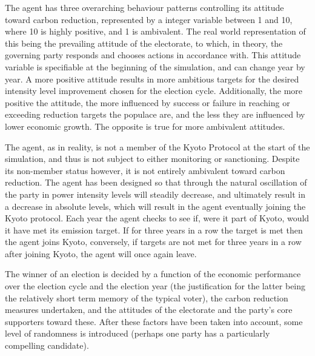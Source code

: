 The agent has three overarching behaviour patterns controlling its attitude toward carbon reduction, represented by a integer variable between 1 and 10, where 10 is highly positive, and 1 is ambivalent. The real world representation of this being the prevailing attitude of the electorate, to which, in theory, the governing party responds and chooses actions in accordance with. This attitude variable is specifiable at the beginning of the simulation, and can change year by year. A more positive attitude results in more ambitious targets for the desired intensity level improvement chosen for the election cycle. Additionally, the more positive the attitude, the more influenced by success or failure in reaching or exceeding reduction targets the populace are, and the less they are influenced by lower economic growth. The opposite is true for more ambivalent attitudes.

The agent, as in reality, is not a member of the Kyoto Protocol at the start of the simulation, and thus is not subject to either monitoring or sanctioning. Despite its non-member status however, it is not entirely ambivalent toward carbon reduction. The agent has been designed so that through the natural oscillation of the party in power intensity levels will steadily decrease, and ultimately result in a decrease in absolute levels, which will result in the agent eventually joining the Kyoto protocol. Each year the agent checks to see if, were it part of Kyoto, would it have met its emission target. If for three years in a row the target is met then the agent joins Kyoto, conversely, if targets are not met for three years in a row after joining Kyoto, the agent will once again leave.

The winner of an election is decided by a function of the economic performance over the election cycle and the election year (the justification for the latter being the relatively short term memory of the typical voter), the carbon reduction measures undertaken, and the attitudes of the electorate and the party's core supporters toward these. After these factors have been taken into account, some level of randomness is introduced (perhaps one party has a particularly compelling candidate).


